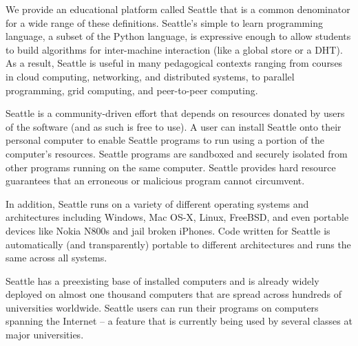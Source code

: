 We provide an educational platform called Seattle that is a common
denominator for a wide range of these definitions. Seattle's simple to
learn programming language, a subset of the Python language, is
expressive enough to allow students to build algorithms for
inter-machine interaction (like a global store or a DHT). As a result,
Seattle is useful in many pedagogical contexts ranging from courses in
cloud computing, networking, and distributed systems, to parallel
programming, grid computing, and peer-to-peer computing.

Seattle is a community-driven effort that depends on resources donated
by users of the software (and as such is free to use). A user can
install Seattle onto their personal computer to enable Seattle
programs to run using a portion of the computer's resources. Seattle
programs are sandboxed and securely isolated from other programs
running on the same computer. Seattle provides hard resource
guarantees that an erroneous or malicious program cannot circumvent.

In addition, Seattle runs on a variety of different operating systems
and architectures including Windows, Mac OS-X, Linux, FreeBSD, and even
portable devices like Nokia N800s and jail broken iPhones. Code written
for Seattle is automatically (and transparently) portable to different
architectures and runs the same across all systems.

Seattle has a preexisting base of installed computers and is already
widely deployed on almost one thousand computers that are spread
across hundreds of universities worldwide. Seattle users can run their
programs on computers spanning the Internet -- a feature that is
currently being used by several classes at major universities.


